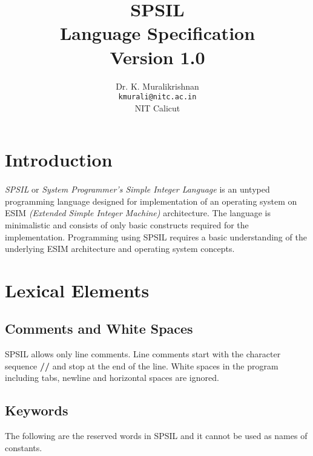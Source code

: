 \documentclass[11pt]{article}
\title{SPSIL \\ Language Specification \\
Version 1.0}
\author{Dr. K. Muralikrishnan  \\ \texttt{kmurali@nitc.ac.in} \\ {NIT Calicut} }
\begin{document}
 \newcommand{\kw}[1]{\texttt{#1}}

\maketitle

\pagebreak
\thispagestyle{plain}

\tableofcontents
\pagebreak


\section{Introduction}
\paragraph{}
\textit{SPSIL} or \textit{System Programmer's Simple Integer Language} is an untyped programming language designed for implementation of an operating system on ESIM \textit{(Extended Simple Integer Machine)} architecture. The language is minimalistic and consists of only basic constructs required for the implementation. Programming using SPSIL requires a  basic understanding of the underlying ESIM architecture and operating system concepts. 



\section{Lexical Elements}




\subsection{Comments and White Spaces}

SPSIL allows only line comments. Line comments start with the character sequence \textbf{//} and stop at the end of the line. 
White spaces in the program including tabs, newline and horizontal spaces are ignored.


\subsection{Keywords}
The following are the reserved words in SPSIL and it cannot be used as names of constants.
\end{document}
